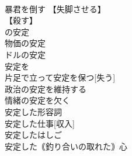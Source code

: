 \documentclass[8pt]{extreport}
\begin{document}
\begin{CJK}{UTF8}{min}
\\	暴君を倒す 【失脚させる】
\\	【殺す】
\\	[(意図的に) 
\\	(暗殺する) 
\\	独裁者を倒せ 【…なんかいらない】
\\	は「…を倒せ」の意の慣用表現) とうかい【倒壊】名詞 
\\	倒壊寸前である 
\\	倒壊する動詞 【つぶれる】
\\	【倒れる】
\\	【破壊される】
\\	地震でそのビルが倒壊した 
\\	倒壊家屋 
\\	とうりつ【倒立】名詞 
\\	【頭と両手をつけてする倒立】
\\	倒立する動詞 
\\	とうかく【倒閣】名詞 
\\	倒閣する動詞 
\\	とうさく【倒錯】 ｟やや書｠
\\	倒錯した愛情 
\\	性的倒錯者 
\\	とうさん【倒産】名詞 
\\	【破綻】
\\	倒産寸前に追い込まれる 
\\	中小企業の倒産が相次いだ 
\\	は不可)
\\	その国の経済は安定している		安定（あんてい） 
\\	あんてい【安定】名詞 
\\	【安定させること】
\\	【足場地位などの】
\\	〖均衡〗
\\	~(の)安定 
\\	経済[社会]の安定 
\\	物価の安定 
\\	ドルの安定 
\\	安定を 
\\	片足で立って安定を保つ[失う] 
\\	政治の安定を維持する 
\\	情緒の安定を欠く 
\\	安定した形容詞 
\\	安定した仕事[収入] 
\\	安定したはしご 
\\	安定した｟釣り合いの取れた｠心 

\end{CJK}
\end{document}
